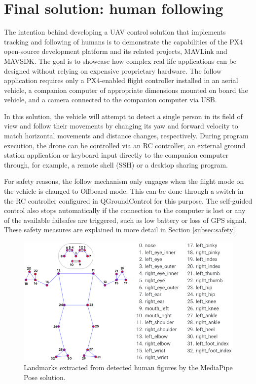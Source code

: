 \section{Final solution: human following}
\label{sec:follow}

The intention behind developing a UAV control solution that implements tracking and following of humans is to demonstrate the capabilities of the PX4 open-source development platform and its related projects, MAVLink and MAVSDK. The goal is to showcase how complex real-life applications can be designed without relying on expensive proprietary hardware. The follow application requires only a PX4-enabled flight controller installed in an aerial vehicle, a companion computer of appropriate dimensions mounted on board the vehicle, and a camera connected to the companion computer via USB.

In this solution, the vehicle will attempt to detect a single person in its field of view and follow their movements by changing its yaw and forward velocity to match horizontal movements and distance changes, respectively.
During program execution, the drone can be controlled via an RC controller, an external ground station application or keyboard input directly to the companion computer through, for example, a remote shell (SSH) or a desktop sharing program.

For safety reasons, the follow mechanism only engages when the flight mode on the vehicle is changed to Offboard mode. This can be done through a switch in the RC controller configured in QGroundControl for this purpose. The self-guided control also stops automatically if the connection to the computer is lost or any of the available failsafes are triggered, such as low battery or loss of GPS signal. These safety measures are explained in more detail in Section \ref{subsec:safety}.

\begin{figure}
  \centering
  \includegraphics[width=\textwidth, keepaspectratio]{img/pose-landmarks.png}
  \caption{Landmarks extracted from detected human figures by the MediaPipe Pose solution.}
  \label{fig:pose-landmarks}
\end{figure}

